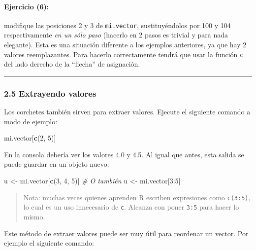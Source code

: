 \documentclass[]{article}
\newenvironment{Shaded}{}{}
\newcommand{\KeywordTok}[1]{\textcolor[rgb]{0.00,0.44,0.13}{\textbf{{#1}}}}
\newcommand{\DecValTok}[1]{\textcolor[rgb]{0.25,0.63,0.44}{{#1}}}
\newcommand{\CommentTok}[1]{\textcolor[rgb]{0.38,0.63,0.69}{\textit{{#1}}}}
\newcommand{\NormalTok}[1]{{#1}}
\begin{document}
\paragraph{Ejercicio (6):}

modifique las posiciones 2 y 3 de \texttt{mi.vector}, sustituyéndolos
por 100 y 104 respectivamente \emph{en un sólo paso} (hacerlo en 2 pasos
es trivial y para nada elegante). Esta es una situación diferente a los
ejemplos anteriores, ya que hay 2 valores reemplazantes. Para hacerlo
correctamente tendrá que usar la función \texttt{c} del lado derecho de
la ``flecha'' de asignación.

\begin{center}\rule{3in}{0.4pt}\end{center}

\subsubsection{2.5 Extrayendo valores}

Los corchetes también sirven para extraer valores. Ejecute el siguiente
comando a modo de ejemplo:

\begin{Shaded}
\begin{Highlighting}[]
\NormalTok{mi.vector[}\KeywordTok{c}\NormalTok{(}\DecValTok{2}\NormalTok{, }\DecValTok{5}\NormalTok{)]}
\end{Highlighting}
\end{Shaded}
En la consola debería ver los valores 4.0 y 4.5. Al igual que antes,
esta salida se puede guardar en un objeto nuevo:

\begin{Shaded}
\begin{Highlighting}[]
\NormalTok{u <- mi.vector[}\KeywordTok{c}\NormalTok{(}\DecValTok{3}\NormalTok{, }\DecValTok{4}\NormalTok{, }\DecValTok{5}\NormalTok{)]}
\CommentTok{# O también}
\NormalTok{u <- mi.vector[}\DecValTok{3}\NormalTok{:}\DecValTok{5}\NormalTok{]}
\end{Highlighting}
\end{Shaded}
\begin{quote}
Nota: muchas veces quienes aprenden R escriben expresiones como
\texttt{c(3:5)}, lo cual es un uso innecesario de \texttt{c}. Alcanza
con poner \texttt{3:5} para hacer lo mismo.

\end{quote}
Este método de extraer valores puede ser muy útil para reordenar un
vector. Por ejemplo el siguiente comando:
\end{document}
